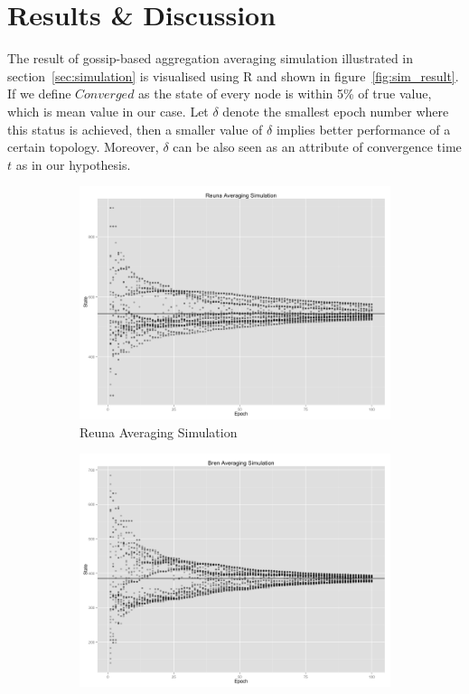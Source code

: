 \section{Results \& Discussion}
\label{sec:result}
The result of gossip-based aggregation averaging simulation illustrated in section~\ref{sec:simulation} is visualised using R and shown in figure~\ref{fig:sim_result}. If we define $Converged$ as the state of every node is within 5\% of true value, which is mean value in our case. Let $\delta$ denote the smallest epoch number where this status is achieved, then a smaller value of $\delta$ implies better performance of a certain topology. Moreover, $\delta$ can be also seen as an attribute of convergence time $t$ as in our hypothesis.
\begin{figure}[h!]
	\centering
    \begin{subfigure}[t]{0.47\textwidth}
    \vspace{0pt}
    \includegraphics[width=\linewidth]{figures/Simulation_averaging/ReunaAvgSim.png}
    \caption{Reuna Averaging Simulation}
    \end{subfigure}
    \begin{subfigure}[t]{0.47\textwidth}
    \vspace{0pt}
    \includegraphics[width=\linewidth]{figures/Simulation_averaging/BrenAvgSim.png}

\end{subfigure}
\end{figure}
